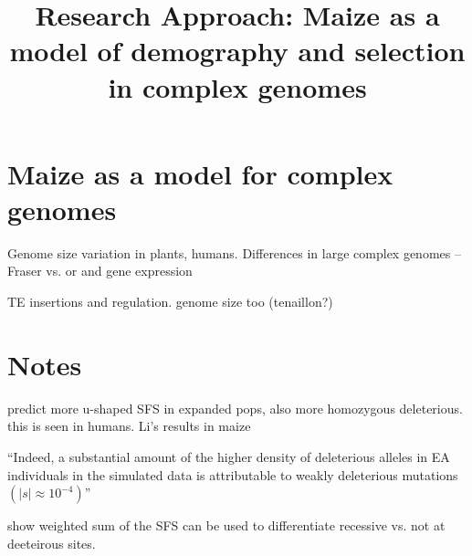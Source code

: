 \documentclass[11pt]{article}
\begin{document}
\title{\vspace{-5ex}Research Approach: Maize as a model of demography and selection in complex genomes\vspace{-4ex}}
\author{}
\date{}
\maketitle



\section*{Maize as a model for complex genomes}

Genome size variation in plants, humans. 
Differences in large complex genomes -- Fraser \citep{fraser2013gene} vs. \citep{pyhajarvi2013complex} or \citep{hancock2011adaptation} and gene expression \citep{hufford2012comparative}

TE insertions \citep{studer2011identification, makarevitch2015transposable} and regulation. genome size too (tenaillon?)




\section*{Notes}

\citep{peischl2015expansion} predict more u-shaped SFS in expanded pops, also more homozygous deleterious. this is seen in humans. Li's results in maize

\citep{fu2014characteristics}
``Indeed, a substantial amount of the higher density of deleterious alleles in EA individuals in the simulated data is attributable to weakly deleterious mutations $(|s| \approx 10^{-4})$''

\citep{balick2013response} show weighted sum of the SFS can be used to differentiate recessive vs. not at deeteirous sites.
\end{document}
